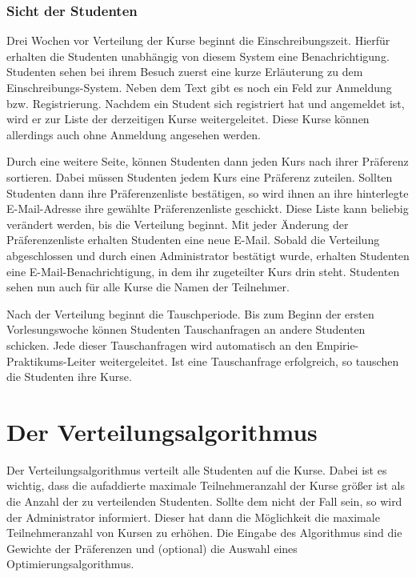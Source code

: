\documentclass[12pt,a4paper]{article}
\begin{document}
            \subsubsection{Sicht der Studenten}
            Drei Wochen vor Verteilung der Kurse beginnt die Einschreibungszeit. Hierfür erhalten die Studenten unabhängig von diesem System eine Benachrichtigung.
            Studenten sehen bei ihrem Besuch zuerst eine kurze Erläuterung zu dem Einschreibungs-System.
            Neben dem Text gibt es noch ein Feld zur Anmeldung bzw. Registrierung.
            Nachdem ein Student sich registriert hat und angemeldet ist, wird er zur Liste der derzeitigen Kurse weitergeleitet.
            Diese Kurse können allerdings auch ohne Anmeldung angesehen werden. %
            
            Durch eine weitere Seite, können Studenten dann jeden Kurs nach ihrer Präferenz sortieren. Dabei müssen Studenten jedem Kurs eine Präferenz zuteilen.
            Sollten Studenten dann ihre Präferenzenliste bestätigen, so wird ihnen an ihre hinterlegte E-Mail-Adresse ihre gewählte Präferenzenliste geschickt.
            Diese Liste kann beliebig verändert werden, bis die Verteilung beginnt.
            Mit jeder Änderung der Präferenzenliste erhalten Studenten eine neue E-Mail. %
            Sobald die Verteilung abgeschlossen und durch einen Administrator bestätigt wurde, erhalten Studenten eine E-Mail-Benachrichtigung, in dem ihr zugeteilter Kurs drin steht.
            Studenten sehen nun auch für alle Kurse die Namen der Teilnehmer.
            
            Nach der Verteilung beginnt die Tauschperiode.
            Bis zum Beginn der ersten Vorlesungswoche können Studenten Tauschanfragen an andere Studenten schicken.
            Jede dieser Tauschanfragen wird automatisch an den Empirie-Praktikums-Leiter weitergeleitet.
            Ist eine Tauschanfrage erfolgreich, so tauschen die Studenten ihre Kurse.
    
    \section{Der Verteilungsalgorithmus}
    Der Verteilungsalgorithmus verteilt alle Studenten auf die Kurse.
    Dabei ist es wichtig, dass die aufaddierte maximale Teilnehmeranzahl der Kurse größer ist als die Anzahl der zu verteilenden Studenten.
    Sollte dem nicht der Fall sein, so wird der Administrator informiert.
    Dieser hat dann die Möglichkeit die maximale Teilnehmeranzahl von Kursen zu erhöhen.
    Die Eingabe des Algorithmus sind die Gewichte der Präferenzen und (optional) die Auswahl eines Optimierungsalgorithmus.
    
\end{document}
